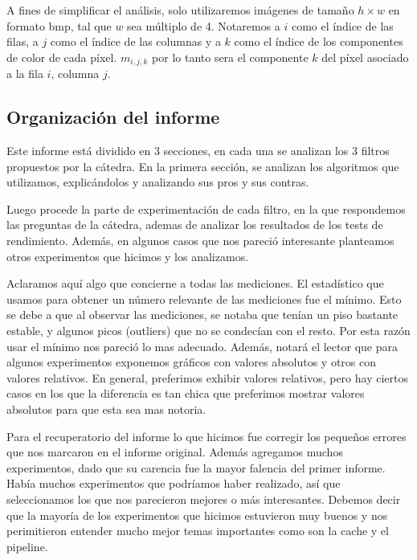 A fines de simplificar el análisis, solo utilizaremos imágenes de tamaño $h\times w$ en formato bmp, tal que $w$ sea múltiplo de 4. Notaremos a $i$ como el índice de las filas, a $j$ como el índice de las columnas y a $k$ como el índice de los componentes de color de cada píxel. $m_{i, j, k}$ por lo tanto sera el componente $k$ del píxel asociado a la fila $i$, columna $j$.


\subsection{Organización del informe}

Este informe está dividido en 3 secciones, en cada una se analizan los 3 filtros propuestos por la cátedra. En la primera sección, se analizan los algoritmos que utilizamos, explicándolos y analizando sus pros y sus contras. 

Luego procede la parte de experimentación de cada filtro, en la que respondemos las preguntas de la cátedra, ademas de analizar los resultados de los tests de rendimiento. Además, en algunos casos que nos pareció interesante planteamos otros experimentos que hicimos y los analizamos.


Aclaramos aquí algo que concierne a todas las mediciones. El estadístico que usamos para obtener un número relevante de las mediciones fue el mínimo. Esto se debe a que al observar las mediciones, se notaba que tenían un piso bastante estable, y algunos picos (outliers) que no se condecían con el resto.
Por esta razón usar el mínimo nos pareció lo mas adecuado. Además, notará el lector que para algunos experimentos exponemos gráficos con valores absolutos y otros con valores relativos. En general, preferimos exhibir valores relativos, pero hay ciertos casos en los que la diferencia es tan chica que preferimos mostrar valores absolutos para que esta sea mas notoria.

Para el recuperatorio del informe lo que hicimos fue corregir los pequeños errores que nos marcaron en el informe original. Además agregamos muchos experimentos, dado que su carencia fue la mayor falencia del primer informe. Había muchos experimentos que podríamos haber realizado, así que seleccionamos los que nos parecieron mejores o más interesantes. Debemos decir que la mayoría de los experimentos que hicimos estuvieron muy buenos y nos perimitieron entender mucho mejor temas importantes como son la cache y el pipeline.

\normalsize
